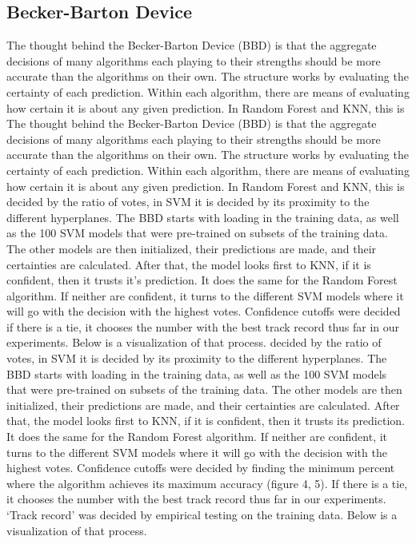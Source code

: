 \documentclass[11pt, oneside]{article}   	%
\begin{document}
\subsection{Becker-Barton Device}
The thought behind the Becker-Barton Device (BBD) is that the aggregate decisions of many algorithms each playing to their strengths should be more accurate than the algorithms on their own. The structure works by evaluating the certainty of each prediction. Within each algorithm, there are means of evaluating how certain it is about any given prediction. In Random Forest and KNN, this is The thought behind the Becker-Barton Device (BBD) is that the aggregate decisions of many algorithms each playing to their strengths should be more accurate than the algorithms on their own. The structure works by evaluating the certainty of each prediction. Within each algorithm, there are means of evaluating how certain it is about any given prediction. In Random Forest and KNN, this is decided by the ratio of votes, in SVM it is decided by its proximity to the different hyperplanes. The BBD starts with loading in the training data, as well as the 100 SVM models that were pre-trained on subsets of the training data. The other models are then initialized, their predictions are made, and their certainties are calculated. After that, the model looks first to KNN, if it is confident, then it trusts it's prediction. It does the same for the Random Forest algorithm. If neither are confident, it turns to the different SVM models where it will go with the decision with the highest votes. Confidence cutoffs were decided  if there is a tie, it chooses the number with the best track record thus far in our experiments. Below is a visualization of that process. decided by the ratio of votes, in SVM it is decided by its proximity to the different hyperplanes. The BBD starts with loading in the training data, as well as the 100 SVM models that were pre-trained on subsets of the training data. The other models are then initialized, their predictions are made, and their certainties are calculated. After that, the model looks first to KNN, if it is confident, then it trusts its prediction. It does the same for the Random Forest algorithm. If neither are confident, it turns to the different SVM models where it will go with the decision with the highest votes. Confidence cutoffs were decided by finding the minimum percent where the algorithm achieves its maximum accuracy (figure 4, 5). If there is a tie, it chooses the number with the best track record thus far in our experiments. `Track record' was decided by empirical testing on the training data. Below is a visualization of that process. 
\end{document}
